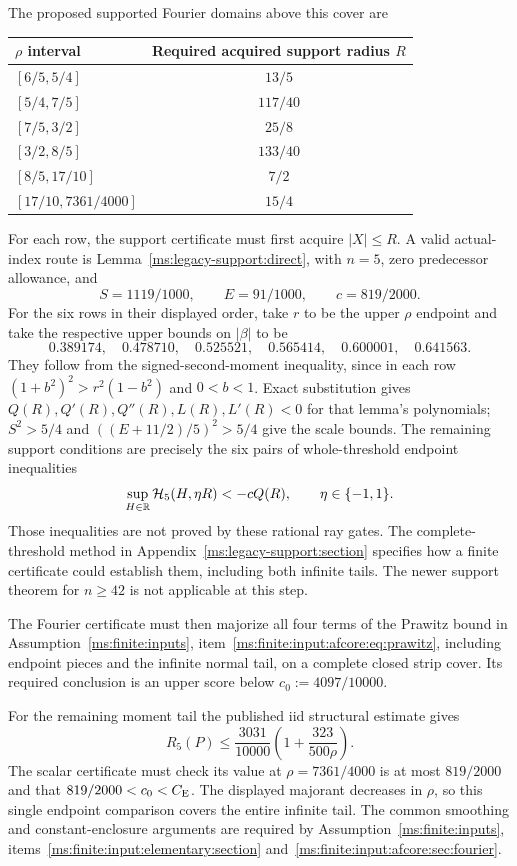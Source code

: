 The proposed supported Fourier domains above this cover are
\begin{center}
\begin{tabular}{@{}lc@{}}\toprule
$\rho$ interval & Required acquired support radius $R$\\\midrule
$[6/5,5/4]$ & $13/5$\\
$[5/4,7/5]$ & $117/40$\\
$[7/5,3/2]$ & $25/8$\\
$[3/2,8/5]$ & $133/40$\\
$[8/5,17/10]$ & $7/2$\\
$[17/10,7361/4000]$ & $15/4$\\\bottomrule
\end{tabular}
\end{center}
For each row, the support certificate must first acquire $|X|\le R$.
A valid actual-index route is Lemma~\ref{ms:legacy-support:direct}, with
$n=5$, zero predecessor allowance, and
\[
 S=1119/1000,\qquad E=91/1000,\qquad c=819/2000.
\]
For the six rows in their displayed order, take $r$ to be the upper
$\rho$ endpoint and take the respective upper bounds on $|\beta|$ to be
\[
 0.389174,\quad 0.478710,\quad 0.525521,\quad 0.565414,\quad
 0.600001,\quad 0.641563.
\]
They follow from the signed-second-moment inequality, since in each row
$(1+b^2)^2>r^2(1-b^2)$ and $0<b<1$. Exact substitution gives
$Q(R),Q'(R),Q''(R),L(R),L'(R)<0$ for that lemma's polynomials;
$S^2>5/4$ and $((E+11/2)/5)^2>5/4$ give the scale bounds.
The remaining support conditions are precisely the six pairs of
whole-threshold endpoint inequalities
\[
 \sup_{H\in\mathbb R}\mathcal H_5(H,\eta R)<-cQ(R),\qquad \eta\in\{-1,1\}.
\]
Those inequalities are not proved by these rational ray gates. The
complete-threshold method in Appendix~\ref{ms:legacy-support:section}
specifies how a finite certificate could establish them, including both
infinite tails. The newer support theorem for $n\ge42$ is not applicable
at this step.

The Fourier certificate must then majorize all four terms of
the Prawitz bound in Assumption~\ref{ms:finite:inputs}, item~\ref{ms:finite:input:afcore:eq:prawitz}, including endpoint pieces and the infinite
normal tail, on a complete closed strip cover. Its required conclusion
is an upper score below $c_0:=4097/10000$.

For the remaining moment tail the published iid structural estimate
\cite{Shevtsova2013} gives
\[
 R_5(P)\le\frac{3031}{10000}
             \left(1+\frac{323}{500\rho}\right).
\]
The scalar certificate must check its value at $\rho=7361/4000$ is
at most $819/2000$ and that $819/2000<c_0<C_{\mathrm E}$.
The displayed majorant decreases in $\rho$, so this single endpoint
comparison covers the entire infinite tail. The common smoothing and
constant-enclosure arguments are required by Assumption~\ref{ms:finite:inputs},
items~\ref{ms:finite:input:elementary:section} and~\ref{ms:finite:input:afcore:sec:fourier}.

